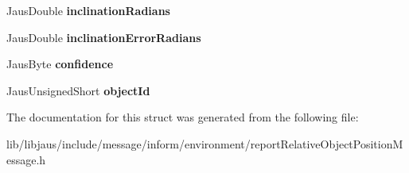 \begin{DoxyCompactItemize}
\item 
\hypertarget{struct_report_relative_object_position_message_struct_a07c5e8474829dc8d9a099dbbffc78fa3}{\-Jaus\-Double {\bfseries inclination\-Radians}}\label{struct_report_relative_object_position_message_struct_a07c5e8474829dc8d9a099dbbffc78fa3}

\item 
\hypertarget{struct_report_relative_object_position_message_struct_ad75aacf0500204dd1455452579687c62}{\-Jaus\-Double {\bfseries inclination\-Error\-Radians}}\label{struct_report_relative_object_position_message_struct_ad75aacf0500204dd1455452579687c62}

\item 
\hypertarget{struct_report_relative_object_position_message_struct_aae1bc42ffa0df2b598edbdc36fc2623c}{\-Jaus\-Byte {\bfseries confidence}}\label{struct_report_relative_object_position_message_struct_aae1bc42ffa0df2b598edbdc36fc2623c}

\item 
\hypertarget{struct_report_relative_object_position_message_struct_a2406d3b6116f0880a78c39a65d372bc3}{\-Jaus\-Unsigned\-Short {\bfseries object\-Id}}\label{struct_report_relative_object_position_message_struct_a2406d3b6116f0880a78c39a65d372bc3}

\end{DoxyCompactItemize}


\-The documentation for this struct was generated from the following file\-:\begin{DoxyCompactItemize}
\item 
lib/libjaus/include/message/inform/environment/report\-Relative\-Object\-Position\-Message.\-h\end{DoxyCompactItemize}
